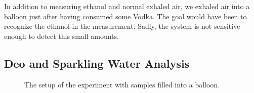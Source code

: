     
    In addition to measuring ethanol and normal exhaled air, we exhaled air into a balloon just after having consumed some Vodka. The goal would have been to recognize the ethanol in the measurement. Sadly, the system is not sensitive enough to detect this small amounts.
    
    
    \newpage
    \subsection{Deo and Sparkling Water Analysis}
    
    \begin{figure}[h]
            \centering
            \quad
            \quad
            \caption{The setup of the experiment with samples filled into a balloon.}
            \label{fig:setup2}
    \end{figure}
    
